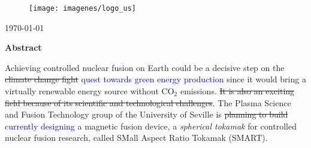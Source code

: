 \documentclass[a4paper,12pt,oneside]{book}
\begin{document}
\begin{center}
%
%
\vfill

\begin{figure}[htbp]
\centering
\texttt{[image: imagenes/logo\_us]}
\end{figure}

\vfill

\today \\

%
%
%
\end{center}
%

\newpage\null
\thispagestyle{empty}

%
\newpage


\begin{center}
\begin{large}
\textbf{Abstract}
\end{large}

\end{center}


Achieving controlled nuclear fusion on Earth could be a decisive step on the \st{climate change fight} \textcolor{blue}{quest towards green energy production} since it would bring a virtually renewable energy source without CO$_2$ emissions. \st{It is also an exciting field because of its scientific and technological challenges}. The Plasma Science and Fusion Technology group of the University of Seville is \st{planning to build} \textcolor{blue}{currently designing} a magnetic fusion device, a \textit{spherical tokamak} for controlled nuclear fusion research, called SMall Aspect Ratio Tokamak (SMART).
\end{document}
